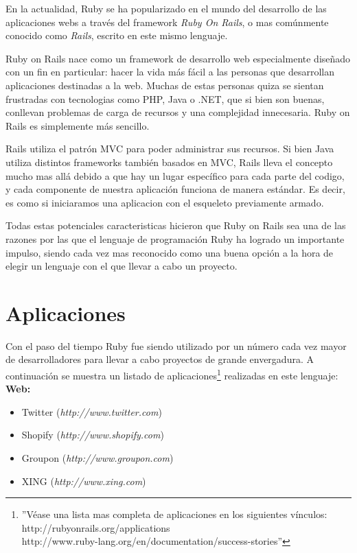 \documentclass{article}
\begin{document}
	En la actualidad, Ruby se ha popularizado en el mundo del desarrollo de las aplicaciones webs a través del framework \textit{Ruby On Rails}, o mas comúnmente conocido como \textit{Rails}, escrito en este mismo lenguaje.
	\par
	Ruby on Rails nace como un framework de desarrollo web especialmente diseñado con un fin en particular: hacer la vida más fácil a las personas que desarrollan aplicaciones destinadas a la web. Muchas de estas personas quiza se sientan frustradas con tecnologias como PHP, Java o .NET, que si bien son buenas, conllevan problemas de carga de recursos y una complejidad innecesaria. Ruby on Rails es simplemente más sencillo.
	\par
	Rails utiliza el patrón MVC para poder administrar sus recursos. Si bien Java utiliza distintos frameworks también basados en MVC, Rails lleva el concepto mucho mas allá debido a que hay un lugar específico para cada parte del codigo, y cada componente de nuestra aplicación funciona de manera estándar. Es decir, es como si iniciaramos una aplicacion con el esqueleto previamente armado.
	\par
	Todas estas potenciales caracteristicas hicieron que Ruby on Rails sea una de las razones por las que el lenguaje de programación Ruby ha logrado un importante impulso, siendo cada vez mas reconocido como una buena opción a la hora de elegir un lenguaje con el que llevar a cabo un proyecto.




\section{Aplicaciones}

Con el paso del tiempo Ruby fue siendo utilizado por un número cada vez mayor de desarrolladores para llevar a cabo proyectos de grande envergadura. A continuación se muestra un listado de aplicaciones\footnote{''Véase una lista mas completa de aplicaciones en los siguientes vínculos: http://rubyonrails.org/applications\\http://www.ruby-lang.org/en/documentation/success-stories''} realizadas en este lenguaje:
\bigskip\\

\textbf{Web:}
\begin{itemize}
	\itemsep=1pt \topsep=0pt \partopsep=0pt \parskip=0pt \parsep=0pt
	\item Twitter (\textit{http://www.twitter.com})
	\item Shopify (\textit{http://www.shopify.com})
	\item Groupon (\textit{http://www.groupon.com})
	\item XING (\textit{http://www.xing.com})
\end{itemize}
\medskip
\end{document}

